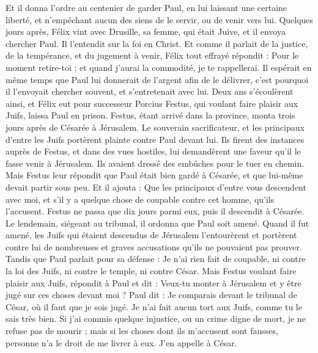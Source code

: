 \begin{multicols}{2}
Et il donna l'ordre au centenier de garder Paul, en lui laissant une certaine liberté, et n'empêchant aucun des siens de le servir, ou de venir vers lui.
Quelques jours après, Félix vint avec Drusille, sa femme, qui était Juive, et il envoya chercher Paul. Il l'entendit sur la foi en Christ.
Et comme il parlait de la justice, de la tempérance, et du jugement à venir, Félix tout effrayé répondit : Pour le moment retire-toi ; et quand j'aurai la commodité, je te rappellerai.
Il espérait en même temps que Paul lui donnerait de l'argent afin de le délivrer, c'est pourquoi il l'envoyait chercher souvent, et s'entretenait avec lui.
Deux ans s'écoulèrent ainsi, et Félix eut pour successeur Porcius Festus, qui voulant faire plaisir aux Juifs, laissa Paul en prison.
\VerseOne{}Festus, étant arrivé dans la province, monta trois jours après de Césarée à Jérusalem.
Le souverain sacrificateur, et les principaux d'entre les Juifs portèrent plainte contre Paul devant lui. Ils firent des instances auprès de Festus, et dans des vues hostiles,
lui demandèrent une faveur qu'il le fasse venir à Jérusalem. Ils avaient dressé des embûches pour le tuer en chemin.
Mais Festus leur répondit que Paul était bien gardé à Césarée, et que lui-même devait partir sous peu.
Et il ajouta : Que les principaux d'entre vous descendent avec moi, et s'il y a quelque chose de coupable contre cet homme, qu'ils l'accusent.
Festus ne passa que dix jours parmi eux, puis il descendit à Césarée. Le lendemain, siégeant au tribunal, il ordonna que Paul soit amené.
Quand il fut amené, les Juifs qui étaient descendus de Jérusalem l'entourèrent et portèrent contre lui de nombreuses et graves accusations qu'ils ne pouvaient pas prouver.
Tandis que Paul parlait pour sa défense : Je n'ai rien fait de coupable, ni contre la loi des Juifs, ni contre le temple, ni contre César.
Mais Festus voulant faire plaisir aux Juifs, répondit à Paul et dit : Veux-tu monter à Jérusalem et y être jugé sur ces choses devant moi ?
Paul dit : Je comparais devant le tribunal de César, où il faut que je sois jugé. Je n'ai fait aucun tort aux Juifs, comme tu le sais très bien.
Si j'ai commis quelque injustice, ou un crime digne de mort, je ne refuse pas de mourir ; mais si les choses dont ils m'accusent sont fausses, personne n'a le droit de me livrer à eux. J'en appelle à César.

\end{multicols}
